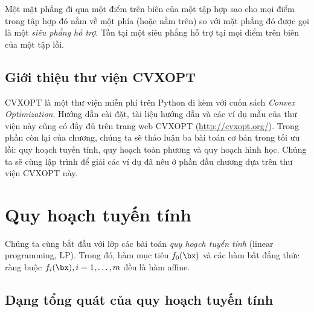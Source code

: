 Một mặt phẳng đi qua một điểm trên biên của một tập hợp sao cho mọi điểm trong
tập hợp đó nằm về một phía (hoặc nằm trên) so với mặt phẳng đó được gọi là
một \textit{siêu phẳng hỗ trợ}. Tồn tại một siêu phẳng hỗ trợ tại mọi điểm trên biên của một tập lồi.
 
 
\subsection{Giới thiệu thư viện CVXOPT}
CVXOPT là một thư viện miễn phí trên Python đi kèm với cuốn sách \textit{Convex
Optimization}. Hướng dẫn cài đặt, tài liệu hướng dẫn và các ví dụ mẫu của thư
viện này cũng có đầy đủ trên trang web CVXOPT (\url{http://cvxopt.org/}). Trong
phần còn lại của chương, chúng ta sẽ thảo luận ba bài toán cơ bản trong tối ưu lồi: quy hoạch tuyến tính, quy hoạch toàn phương và quy hoạch hình học. Chúng ta sẽ cùng lập trình để giải các ví dụ đã nêu ở phần đầu chương dựa trên thư viện CVXOPT này.
 
 
\section{Quy hoạch tuyến tính}
Chúng ta cùng bắt đầu với lớp các bài toán \textit{quy hoạch tuyến tính} (linear programming, LP). Trong đó, hàm mục tiêu $f_0(\bx)$ và
các hàm bất đẳng thức ràng buộc $f_i(\bx), i = 1, \dots, m$ đều là hàm {affine}.
 
\subsection{Dạng tổng quát của quy hoạch tuyến tính}
{}

